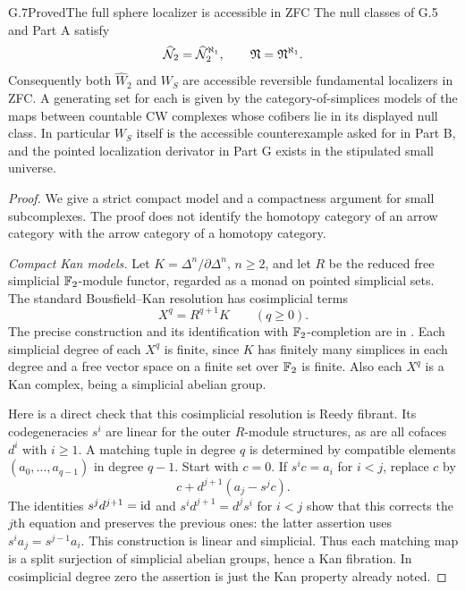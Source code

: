 \begin{claim}{G.7}{Proved}{The full sphere localizer is accessible in ZFC}
The null classes of G.5 and Part A satisfy
\[
 \widehat{\mathcal N}_2
       =\widehat{\mathcal N}_2^{\aleph_1},
 \qquad \mathfrak N=\mathfrak N^{\aleph_1}.
\]
Consequently both $\widehat W_2$ and $W_S$ are accessible reversible fundamental localizers in ZFC. A generating set for each is given by the category-of-simplices models of the maps between countable CW complexes whose cofibers lie in its displayed null class. In particular $W_S$ itself is the accessible counterexample asked for in Part B, and the pointed localization derivator in Part G exists in the stipulated small universe.
\end{claim}
\begin{proof}
We give a strict compact model and a compactness argument for small subcomplexes. The proof does not identify the homotopy category of an arrow category with the arrow category of a homotopy category.

\emph{Compact Kan models.}
Let $K=\Delta^n/\partial\Delta^n$, $n\geq2$, and let $R$ be the reduced free simplicial $\mathbb F_2$-module functor, regarded as a monad on pointed simplicial sets. The standard Bousfield--Kan resolution has cosimplicial terms
\[
 X^q=R^{q+1}K\qquad(q\geq0).
\]
The precise construction and its identification with $\mathbb F_2$-completion are in \cite[\S7.7, pp.~1032--1033]{FGHBousfield2003}. Each simplicial degree of each $X^q$ is finite, since $K$ has finitely many simplices in each degree and a free vector space on a finite set over $\mathbb F_2$ is finite. Also each $X^q$ is a Kan complex, being a simplicial abelian group.

Here is a direct check that this cosimplicial resolution is Reedy fibrant. Its codegeneracies $s^i$ are linear for the outer $R$-module structures, as are all cofaces $d^i$ with $i\geq1$. A matching tuple in degree $q$ is determined by compatible elements $(a_0,\ldots,a_{q-1})$ in degree $q-1$. Start with $c=0$. If $s^ic=a_i$ for $i<j$, replace $c$ by
\[
 c+d^{j+1}(a_j-s^jc).
\]
The identities $s^jd^{j+1}=\mathrm{id}$ and $s^id^{j+1}=d^js^i$ for $i<j$ show that this corrects the $j$th equation and preserves the previous ones: the latter assertion uses $s^i a_j=s^{j-1}a_i$. This construction is linear and simplicial. Thus each matching map is a split surjection of simplicial abelian groups, hence a Kan fibration. In cosimplicial degree zero the assertion is just the Kan property already noted.


\end{proof}
